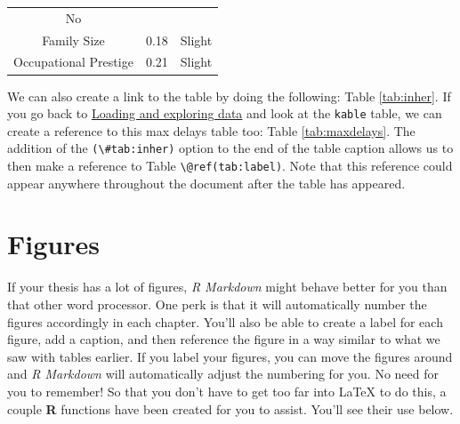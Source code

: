 \documentclass[12pt,twoside]{Mactemplate}
\theoremstyle{definition}
\theoremstyle{definition}
\theoremstyle{definition}
\theoremstyle{remark}
\begin{document}
\begin{longtable}[]{@{}ccc@{}}
\begin{minipage}[t]{0.16\columnwidth}
No\strut
\end{minipage}\tabularnewline
\begin{minipage}[t]{0.29\columnwidth}\centering\strut
Family Size\strut
\end{minipage} & \begin{minipage}[t]{0.47\columnwidth}\centering\strut
0.18\strut
\end{minipage} & \begin{minipage}[t]{0.16\columnwidth}\centering\strut
Slight\strut
\end{minipage}\tabularnewline
\begin{minipage}[t]{0.29\columnwidth}\centering\strut
Occupational Prestige\strut
\end{minipage} & \begin{minipage}[t]{0.47\columnwidth}\centering\strut
0.21\strut
\end{minipage} & \begin{minipage}[t]{0.16\columnwidth}\centering\strut
Slight\strut
\end{minipage}\tabularnewline
\bottomrule
\end{longtable}
We can also create a link to the table by doing the following: Table
\ref{tab:inher}. If you go back to
\protect\hyperlink{loading-and-exploring-data}{Loading and exploring
data} and look at the \texttt{kable} table, we can create a reference to
this max delays table too: Table \ref{tab:maxdelays}. The addition of
the \texttt{(\textbackslash{}\#tab:inher)} option to the end of the
table caption allows us to then make a reference to Table
\texttt{\textbackslash{}@ref(tab:label)}. Note that this reference could
appear anywhere throughout the document after the table has appeared.

\clearpage

\section{Figures}\label{figures}

If your thesis has a lot of figures, \emph{R Markdown} might behave
better for you than that other word processor. One perk is that it will
automatically number the figures accordingly in each chapter. You'll
also be able to create a label for each figure, add a caption, and then
reference the figure in a way similar to what we saw with tables
earlier. If you label your figures, you can move the figures around and
\emph{R Markdown} will automatically adjust the numbering for you. No
need for you to remember! So that you don't have to get too far into
LaTeX to do this, a couple \textbf{R} functions have been created for
you to assist. You'll see their use below.
\end{document}
